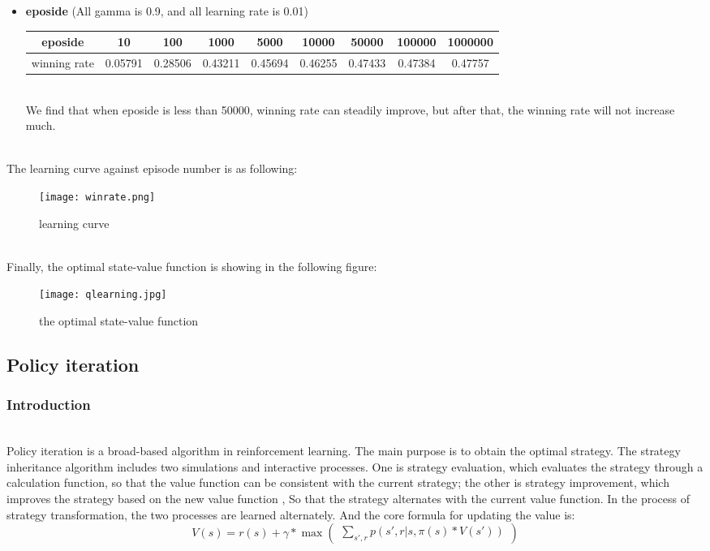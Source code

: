 \documentclass[12pt]{article}
\begin{document}
\begin{itemize}
  \item \textbf{eposide} (All gamma is 0.9, and all learning rate is 0.01)
  \begin{table}[!htbp]
    \centering
    \begin{tabular}{c|c|c|c|c|c|c|c|c}
      \hline
      eposide & 10 & 100 & 1000 & 5000 & 10000 & 50000 & 100000 & 1000000 \\
      \hline
      winning rate & 0.05791 & 0.28506 & 0.43211 & 0.45694 & 0.46255 & 0.47433 & 0.47384 & 0.47757 \\   %
      \hline
    \end{tabular}
  \end{table}
  ~\\We find that when eposide is less than 50000, winning rate can steadily improve, but after that, the winning rate will not increase much.
\end{itemize}

\newpage
~\\\indent The learning curve against episode number is as following:
\begin{figure}[H]
  \centering
  \texttt{[image: winrate.png]}
  \caption{learning curve}
\end{figure}

~\\\indent Finally,  the optimal state-value function is showing in the following figure:
\begin{figure}[H]
   \centering
   \texttt{[image: qlearning.jpg]}
   \caption{the optimal state-value function}
\end{figure}

\newpage
\subsection{Policy iteration}

\subsubsection{Introduction}

~\\\indent Policy iteration is a broad-based algorithm in reinforcement learning. The main purpose is to obtain the optimal strategy. The strategy inheritance algorithm includes two simulations and interactive processes. One is strategy evaluation, which evaluates the strategy through a calculation function, so that the value function can be consistent with the current strategy; the other is strategy improvement, which improves the strategy based on the new value function , So that the strategy alternates with the current value function. In the process of strategy transformation, the two processes are learned alternately.
And the core formula for updating the value is:
$$V(s) = r(s) + \gamma * \max(\begin{matrix} \sum_{s',r} p(s',r|s,\pi(s) * V(s')) \end{matrix})$$
\end{document}
